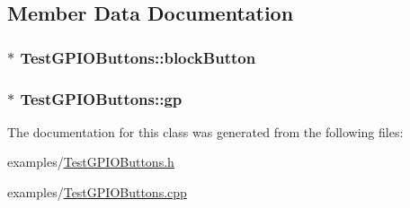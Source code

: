 \subsection{Member Data Documentation}
\hypertarget{class_test_g_p_i_o_buttons_a209a3f0cba53b014bedcd4b7033f550c}{
\subsubsection[{block\-Button}]{$\ast$ Test\-G\-P\-I\-O\-Buttons\-::block\-Button\hspace{0.3cm}{\ttfamily [protected]}}}\label{class_test_g_p_i_o_buttons_a209a3f0cba53b014bedcd4b7033f550c}
\hypertarget{class_test_g_p_i_o_buttons_a6510eba2c7aa5b2e6451a91230328075}{
\subsubsection[{gp}]{$\ast$ Test\-G\-P\-I\-O\-Buttons\-::gp\hspace{0.3cm}{\ttfamily [protected]}}}\label{class_test_g_p_i_o_buttons_a6510eba2c7aa5b2e6451a91230328075}


The documentation for this class was generated from the following files\-:\begin{DoxyCompactItemize}
\item 
examples/\hyperlink{_test_g_p_i_o_buttons_8h}{Test\-G\-P\-I\-O\-Buttons.\-h}\item 
examples/\hyperlink{_test_g_p_i_o_buttons_8cpp}{Test\-G\-P\-I\-O\-Buttons.\-cpp}\end{DoxyCompactItemize}
